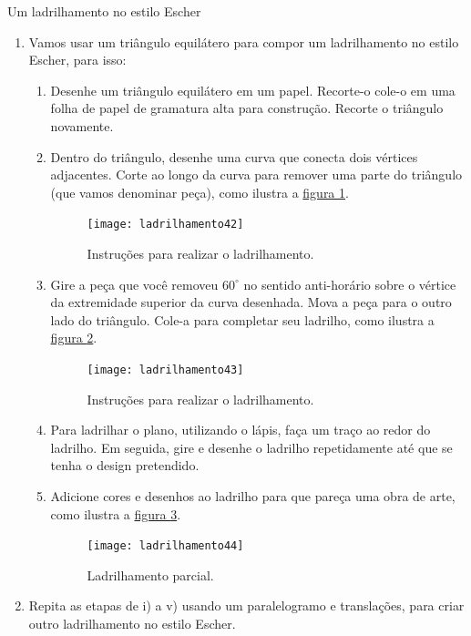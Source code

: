 \begin{task}{Um ladrilhamento no estilo Escher}\label{at_outros3}
\begin{enumerate}
\item Vamos usar um triângulo equilátero para compor um ladrilhamento no estilo Escher, para isso:  
\begin{enumerate}

	\item Desenhe um triângulo equilátero em um papel. Recorte-o  cole-o em uma folha de papel de gramatura alta para construção. Recorte o triângulo novamente.

	\item Dentro do triângulo, desenhe uma curva que conecta dois vértices adjacentes. Corte ao longo da curva para remover uma parte do triângulo (que vamos denominar peça), como ilustra a \hyperref[escher1]{figura \ref{escher1}}.

	\begin{figure}[H]
	\centering
	\texttt{[image: ladrilhamento42]}
	\caption{Instruções para realizar o ladrilhamento.}
	\label{escher1}
	\end{figure}

	\item Gire a peça que você removeu $60^{\circ}$ no sentido anti-horário sobre o vértice da extremidade superior da curva desenhada. Mova a peça para o outro lado do triângulo. Cole-a para completar seu ladrilho, como ilustra a \hyperref[escher2]{figura \ref{escher2}}.

	\begin{figure}[H]
	\centering
	\texttt{[image: ladrilhamento43]}
	\caption{Instruções para realizar o ladrilhamento.}
	\label{escher2}
	\end{figure}

	\item Para ladrilhar o plano, utilizando o lápis, faça um traço ao redor do ladrilho. Em seguida, gire e desenhe o ladrilho repetidamente até que se tenha o design pretendido.
	\item Adicione cores e desenhos ao ladrilho para que pareça uma obra de arte, como ilustra a \hyperref[escher3]{figura \ref{escher3}}.

	\begin{figure}[H]
	\centering
	\texttt{[image: ladrilhamento44]}
	\caption{Ladrilhamento parcial.}
	\label{escher3}
	\end{figure}
\end{enumerate}

	\item Repita as etapas de i) a v) usando um paralelogramo e translações, para criar outro ladrilhamento no estilo Escher.

\end{enumerate}
\end{task}




